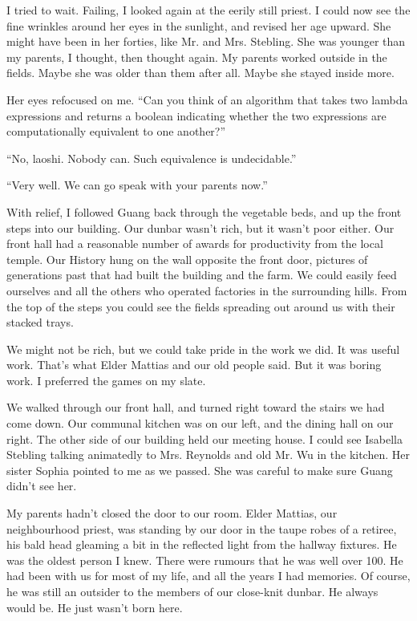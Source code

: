 I tried to wait. Failing, I looked again at the eerily still priest. I could now see the fine wrinkles around her eyes in the sunlight, and revised her age upward. She might have been in her forties, like Mr. and Mrs. Stebling. She was younger than my parents, I thought, then thought again. My parents worked outside in the fields. Maybe she was older than them after all. Maybe she stayed inside more.

Her eyes refocused on me. ``Can you think of an algorithm that takes two lambda expressions and returns a boolean indicating whether the two expressions are computationally equivalent to one another?''

``No, laoshi. Nobody can. Such equivalence is undecidable.''

``Very well. We can go speak with your parents now.''

With relief, I followed Guang back through the vegetable beds, and up the front steps into our building. Our dunbar wasn't rich, but it wasn't poor either. Our front hall had a reasonable number of awards for productivity from the local temple. Our History hung on the wall opposite the front door, pictures of generations past that had built the building and the farm. We could easily feed ourselves and all the others who operated factories in the surrounding hills. From the top of the steps you could see the fields spreading out around us with their stacked trays.

We might not be rich, but we could take pride in the work we did. It was useful work. That's what Elder Mattias and our old people said. But it was boring work. I preferred the games on my slate.

We walked through our front hall, and turned right toward the stairs we had come down. Our communal kitchen was on our left, and the dining hall on our right. The other side of our building held our meeting house. I could see Isabella Stebling talking animatedly to Mrs. Reynolds and old Mr. Wu in the kitchen. Her sister Sophia pointed to me as we passed. She was careful to make sure Guang didn't see her.

My parents hadn't closed the door to our room. Elder Mattias, our neighbourhood priest, was standing by our door in the taupe robes of a retiree, his bald head gleaming a bit in the reflected light from the hallway fixtures. He was the oldest person I knew. There were rumours that he was well over 100. He had been with us for most of my life, and all the years I had memories. Of course, he was still an outsider to the members of our close-knit dunbar. He always would be. He just wasn't born here.

